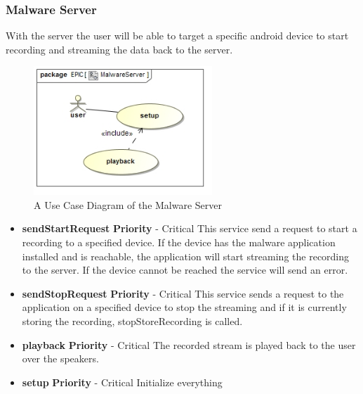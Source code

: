 \documentclass[a4paper,12pt,titlepage]{article}
\begin{document}
	\subsubsection{Malware Server}
	With the server the user will be able to target a specific android device to start recording and streaming the data back to the server.
		\begin{figure}[h!]
 			 \centering
			  \includegraphics[width=0.6\textwidth]{MalwareServerUseCase}
		 	 \caption{A Use Case Diagram of the Malware Server}
		\end{figure}
		\begin{itemize}
			\item \textbf{sendStartRequest}
				\newline\textbf{ Priority } - Critical
				\newline This service send a request to start a recording to a specified device. If the device has the malware application installed and is reachable, the application will start streaming the recording to the server. If the device cannot be reached the service will send an error.
			\item \textbf{sendStopRequest}
				\newline\textbf{ Priority } - Critical
				\newline This service sends a request to the application on a specified device to stop the streaming and if it is currently storing the recording, stopStoreRecording is called.
			\item \textbf{playback}
				\newline\textbf{ Priority } - Critical
				\newline The recorded stream is played back to the user over the speakers.
			\item \textbf{setup}
				\newline\textbf{ Priority } - Critical
				\newline Initialize everything
		\end{itemize}	
		
\end{document}
